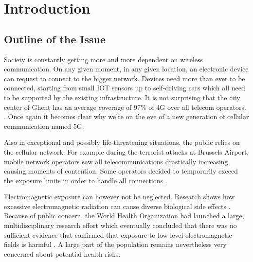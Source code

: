 \chapter{Introduction}
\label{chap:intro}

\section{Outline of the Issue} %
\label{sec:issue}

Society is constantly getting more and more dependent on wireless communication. On any given moment, in any given location, an electronic device
can request to connect to the bigger network. Devices need more than ever to be connected, starting from small IOT sensors up to self-driving cars
which all need to be supported by the existing infrastructure. 
It is not surprising that the city center of Ghent has an average coverage of 97\% of 4G over all telecom operators.
\cite{testaankoop}. Once again it becomes clear why we're on the eve of a new generation of cellular communication named 5G. 

Also in exceptional and possibly life-threatening situations, the public relies on the cellular network. For example during the terrorist attacks at Brussels Airport,
mobile network operators saw all telecommunications drastically increasing causing moments of contention. Some operators decided to temporarily exceed the exposure limits in
order to handle all connections \cite{baseZaventem}.

Electromagnetic exposure can however not be neglected. Research shows how excessive electromagnetic radiation can cause diverse biological side effects \cite{bioeffects}.
Because of public concern, the World Health Organization had launched a large, multidisciplinary research effort which eventually concluded that there was no sufficient evidence that confirmed 
that exposure to low level electromagnetic fields is harmful \cite{WHO}. A large part of the population remains nevertheless very concerned about potential health risks.

